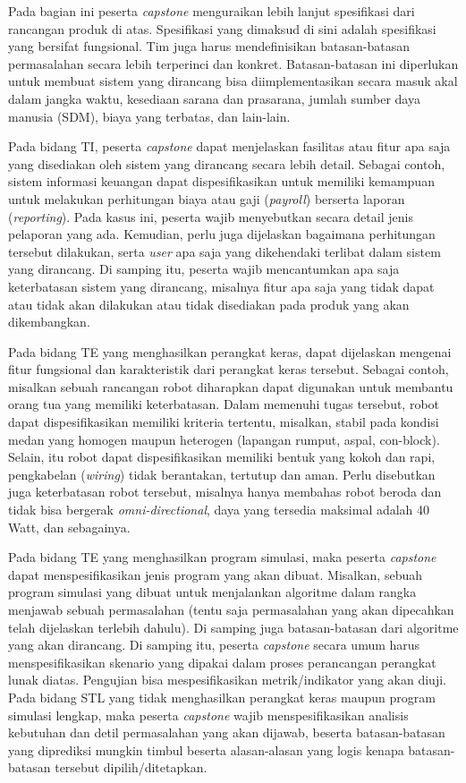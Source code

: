 Pada bagian ini peserta \textit{capstone} menguraikan lebih lanjut spesifikasi dari rancangan produk di atas. Spesifikasi yang dimaksud di sini adalah spesifikasi yang bersifat fungsional. Tim juga harus mendefinisikan batasan-batasan permasalahan secara lebih terperinci dan konkret. Batasan-batasan ini diperlukan untuk membuat sistem yang dirancang bisa diimplementasikan secara masuk akal dalam jangka waktu, kesediaan sarana dan prasarana, jumlah sumber daya manusia (SDM), biaya yang terbatas, dan lain-lain. 

Pada bidang TI, peserta \textit{capstone} dapat menjelaskan fasilitas atau fitur apa saja yang disediakan oleh sistem yang dirancang secara lebih detail. Sebagai contoh, sistem informasi keuangan dapat dispesifikasikan untuk memiliki kemampuan untuk melakukan perhitungan biaya atau gaji (\textit{payroll}) berserta laporan (\textit{reporting}). Pada kasus ini, peserta wajib menyebutkan secara detail jenis pelaporan yang ada. Kemudian, perlu juga dijelaskan bagaimana perhitungan tersebut dilakukan, serta \textit{user} apa saja yang dikehendaki terlibat dalam sistem yang dirancang. Di samping itu, peserta wajib mencantumkan apa saja keterbatasan sistem yang dirancang, misalnya fitur apa saja yang tidak dapat atau tidak akan dilakukan atau tidak disediakan pada produk yang akan dikembangkan. 

Pada bidang TE yang menghasilkan perangkat keras, dapat dijelaskan mengenai fitur fungsional dan karakteristik dari perangkat keras tersebut. Sebagai contoh, misalkan sebuah rancangan robot diharapkan dapat digunakan untuk membantu orang tua yang memiliki keterbatasan. Dalam memenuhi tugas tersebut, robot dapat dispesifikasikan memiliki kriteria tertentu, misalkan, stabil pada kondisi medan yang homogen maupun heterogen (lapangan rumput, aspal, con-block). Selain, itu robot dapat dispesifikasikan memiliki bentuk yang kokoh dan rapi, pengkabelan (\textit{wiring}) tidak berantakan, tertutup dan aman. Perlu disebutkan juga keterbatasan robot tersebut, misalnya hanya membahas robot beroda dan tidak bisa bergerak \textit{omni-directional}, daya yang tersedia maksimal adalah 40 Watt, dan sebagainya. 

Pada bidang TE yang menghasilkan program simulasi, maka peserta \textit{capstone} dapat menspesifikasikan jenis program yang akan dibuat. Misalkan, sebuah program simulasi yang dibuat untuk menjalankan algoritme dalam rangka menjawab sebuah permasalahan (tentu saja permasalahan yang akan dipecahkan telah dijelaskan terlebih dahulu). Di samping juga batasan-batasan dari algoritme yang akan dirancang. Di samping itu, peserta \textit{capstone} secara umum harus menspesifikasikan skenario yang dipakai dalam proses perancangan perangkat lunak diatas. Pengujian bisa mespesifikasikan metrik/indikator yang akan diuji. Pada bidang STL yang tidak menghasilkan perangkat keras maupun program simulasi lengkap, maka peserta \textit{capstone} wajib menspesifikasikan analisis kebutuhan dan detil permasalahan yang akan dijawab, beserta batasan-batasan yang diprediksi mungkin timbul beserta alasan-alasan yang logis kenapa batasan-batasan tersebut dipilih/ditetapkan.

